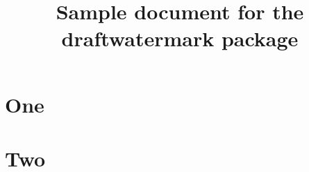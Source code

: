 \documentclass{article}
\title{Sample document for the draftwatermark package}
\author{}
\begin{document}
\maketitle

\section{One}
\lipsum[1-3]

\section{Two}
\lipsum[4-6]
\end{document}
